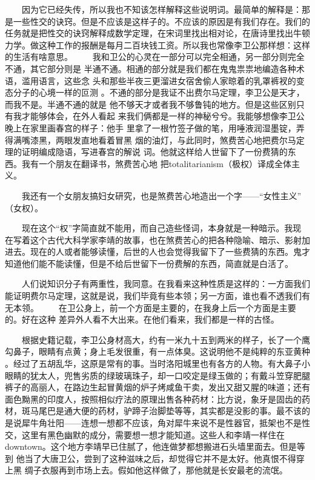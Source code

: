  　　因为它已经失传，所以我也不知该怎样解释这些说明词。最简单的解释是：那 是一些性交的诀窍。但是不应该是这样子的。不应该的原因是有我们存在。我们的 任务就是把性交的诀窍解释成数学定理，在宋词里找出相对论，在唐诗里找出牛顿 力学。做这种工作的报酬是每月二百块钱工资。所以我也常像李卫公那样想：这样 的生活有啥意思。 　　我和卫公的心灵在一部分可以完全相通，另一部分则完全不通，其它部分则是 半通不通。相通的部分就是我们都在鬼鬼祟祟地编造各种术语，滥用语言，这些念 头和那些半夜三更溜进女宿舍偷人家晾着的乳罩裤衩的变态分子的心境一样的叵测 。不通的部分是我证不出费尔马定理，李卫公是天才，而我不是。半通不通的就是 他不够天才或者我不够鲁钝的地方。但是这些区别只有我才能够体会，在外人看起 来我们俩都是一样的神秘兮兮。我能够想像李卫公晚上在家里画春宫的样子：他手 里拿了一根竹签子做的笔，用唾液润湿墨锭，弄得满嘴漆黑，两眼发直地看着冒黑 烟的油灯，与此同时，煞费苦心地把费尔马定理的证明编成隐语，写进春宫的解说 词。他就这样给人世留下了一份费猜的东西。我有一个朋友在翻译书，煞费苦心地 把totalitarianism（极权）译成全体主义。 

　　我还有一个女朋友搞妇女研究，也是煞费苦心地造出一个字——“女性主义” （女权）。

 　　现在这个“权”字简直就不能用，而自己造些怪词，本身就是一种暗示。我现 在写着这个古代大科学家李靖的故事，也在煞费苦心的把各种隐喻、暗示、影射加 进去。现在的人或者能够读懂，后世的人也会觉得我留下了一些费猜的东西。鬼才 知道他们能不能读懂，但是不给后世留下一份费解的东西，简直就是白活了。

 　　人们说知识分子有两重性，我同意。在我看来这种性质是这样的：一方面我们 能证明费尔马定理，这就是说，我们毕竟有些本领；另一方面，谁也看不透我们有 无本领。 　　在卫公身上，前一个方面是主要的，在我身上后一个方面是主要的。好在这种 差异外人看不大出来。在他们看来，我们都是一样的古怪。

 　　根据史籍记载，李卫公身材高大，约有一米九十五到两米的样子，长了一个鹰 勾鼻子，眼睛有点黄；身上毛发很重，有一点体臭。这说明他不是纯粹的东亚黄种 。经过了五胡乱华，这原是常有的事。当时洛阳城里也有各方的人物。有大鼻子小 眼睛的犹太人，兜售劣质的绿玻璃珠子，却一口咬定是绿玉做的；有戴斗笠穿肥腿 裤子的高丽人，在路边生起冒黄烟的炉子烤咸鱼干卖，发出又甜又腥的味道；还有 面色黝黑的印度人，按照相似疗法的原理出售各种药材：比方说，象牙是固齿的药 材，斑马尾巴是通大便的药材，驴蹄子治脚垫等等，其实都是没影的事。最不该的 是说犀牛角壮阳——连想一想都不应该，角对犀牛来说不是性器官，抵架也不是性 交，这里有黑色幽默的成分，需要想一想才能知道。这些人和李靖一样住在 downtown。这个地方李靖早已住腻了，他连做梦都想搬进石头墙里面去。但是等到 他当了大唐卫公，尝到了这种滋味之后，却觉得它并不是太好。他真恨不得穿上黑 绸子衣服再到市场上去。假如他这样做了，那他就是长安最老的流氓。

